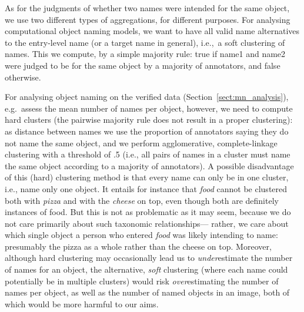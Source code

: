 As for the judgments of whether two names were intended for the same object, we use two different types of aggregations, for different purposes.
For analysing computational object naming models, we want to have all valid name alternatives to the entry-level name (or a target name in general), i.e.,~a soft clustering of names. 
This we compute, by a simple majority rule: true if name1 and name2 were judged to be for the same object by a majority of annotators, and false otherwise.

For analysing object naming on the verified \mn data (Section~\ref{sect:mn_analysis}), e.g.~assess the mean number of names per object, however, 
we need   to compute hard clusters
(the pairwise majority rule does not result in a proper clustering): as distance between names we use the proportion of annotators saying they do not name the same object, and we perform agglomerative, complete-linkage clustering with a threshold of .5 (i.e., all pairs of names in a cluster must name the same object according to a majority of annotators).
A possible disadvantage of this (hard) clustering method is that every name can only be in one cluster, i.e., name only one object.
It entails for instance that \emph{food} cannot be clustered both with \emph{pizza} and with the \emph{cheese} on top, even though both are definitely instances of food.
But this is not as problematic as it may seem, because we do not care primarily about such taxonomic relationships--- %
rather, we care about %
which single object a person who entered \emph{food} was likely intending to name: presumably the pizza as a whole rather than the cheese on top. 
Moreover, although hard clustering may occasionally lead us to \emph{under}estimate the number of names for an object, the alternative, \emph{soft} clustering (where each name could potentially be in multiple clusters) would risk \emph{over}estimating the number of names per object, as well as the number of named objects in an image, both of which would be more harmful to our aims.

